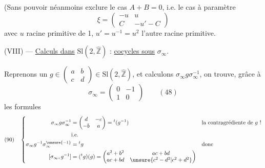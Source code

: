 
(Sans pouvoir néanmoins exclure le cas
$A+B=0$, 
i.e. le cas à  paramètre
\[
\xi=\begin{pmatrix}-u&u\\C&-u'-C\end{pmatrix}
\]
avec $u$ racine primitive  de 1,
$u'=u^{-1}=u^2$ l'autre racine primitive.


(VIII) --- \uline{Calculs dans} $\mathrm{Sl}(2,\widehat{\mathbb Z})$ : \uline{cocycles sous} $\sigma_\infty$.

Reprenons un $g\in\begin{pmatrix}a&b\\c&d\end{pmatrix}\in\mathrm{Sl}(2,\widehat{\mathbb Z})$,
et calculons $\sigma_\infty g\sigma_\infty^{-1}$, on trouve, grâce à
\[
\sigma_\infty=\begin{pmatrix}0&-1\\1&0\end{pmatrix}\qquad (48)
\]
les formules
\[
(90)\quad\left\{
\begin{aligned}
\sigma_\infty g\sigma_\infty^{-1}
&=\begin{pmatrix}d&-c\\-b&a\end{pmatrix}={}^t(g^{-1})
&&\text{la contragrédiente de $g$ !}\\
&\text{i.e.}\\
\sigma_\infty g^{-1}\sigma_\infty^{\unsure{-1}}
&={}^t g&&\text{donc}\\
[\sigma_\infty,g^{-1}]&=({}^t g)(g)
=\begin{pmatrix}a^2+b^2&ac+bd\\ac+bd&\unsure{c^2-d^2|c^2+d^2}\end{pmatrix}
\end{aligned}\right.
\]



